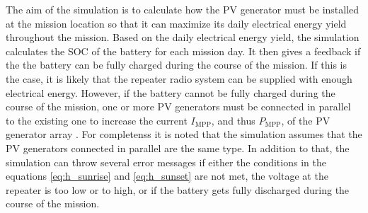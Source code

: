 The aim of the \MATLAB simulation is to calculate how the PV generator must be installed at the mission location so that it can maximize its daily electrical energy yield throughout the mission. Based on the daily electrical energy yield, the \MATLAB simulation calculates the SOC of the battery for each mission day. It then gives a feedback if the the battery can be fully charged during the course of the mission. If this is the case, it is likely that the repeater radio system can be supplied with enough electrical energy. However, if the battery cannot be fully charged during the course of the mission, one or more PV generators must be connected in parallel to the existing one to increase the current $I_\mathrm{MPP}$, and thus $P_\mathrm{MPP}$, of the PV generator array \cite{Mertens:2015}. For completenss it is noted that the \MATLAB simulation assumes that the PV generators connected in parallel are the same type. In addition to that, the simulation can throw several error messages if either the conditions in the equations \ref{eq:h_sunrise} and \ref{eq:h_sunset} are not met, the voltage at the repeater is too low or to high, or if the battery gets fully discharged during the course of the mission.

